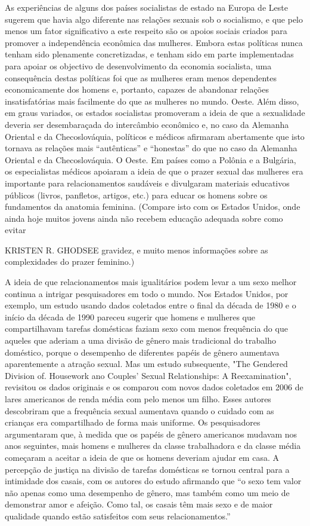  \par 
As experiências de alguns dos países socialistas de estado na Europa de Leste sugerem que havia algo diferente nas relações sexuais sob o socialismo, e que pelo menos um fator significativo a este respeito são os apoios sociais criados para promover a independência econômica das mulheres. Embora estas políticas nunca tenham sido plenamente concretizadas, e tenham sido em parte implementadas para apoiar os objectivo de desenvolvimento da economia socialista, uma consequência destas políticas foi que as mulheres eram menos dependentes economicamente dos homens e, portanto, capazes de abandonar relações insatisfatórias mais facilmente do que as mulheres no mundo. Oeste. Além disso, em graus variados, os estados socialistas promoveram a ideia de que a sexualidade deveria ser desembaraçada do intercâmbio econômico e, no caso da Alemanha Oriental e da Checoslováquia, políticos e médicos afirmaram abertamente que isto tornava as relações mais “autênticas” e “honestas” do que no caso da Alemanha Oriental e da Checoslováquia. O Oeste. Em países como a Polônia e a Bulgária, os especialistas médicos apoiaram a ideia de que o prazer sexual das mulheres era importante para relacionamentos saudáveis ​​e divulgaram materiais educativos públicos (livros, panfletos, artigos, etc.) para educar os homens sobre os fundamentos da anatomia feminina. (Compare isto com os Estados Unidos, onde ainda hoje muitos jovens ainda não recebem educação adequada sobre como evitar
 \par 
KRISTEN R. GHODSEE gravidez, e muito menos informações sobre as complexidades do prazer feminino.)
 \par 
A ideia de que relacionamentos mais igualitários podem levar a um sexo melhor continua a intrigar pesquisadores em todo o mundo. Nos Estados Unidos, por exemplo, um estudo usando dados coletados entre o final da década de 1980 e o início da década de 1990 pareceu sugerir que homens e mulheres que compartilhavam tarefas domésticas faziam sexo com menos frequência do que aqueles que aderiam a uma divisão de gênero mais tradicional do trabalho doméstico, porque o desempenho de diferentes papéis de gênero aumentava aparentemente a atração sexual. Mas um estudo subsequente, "The Gendered Division of. Housework ano Couples' Sexual Relationships: A Reexamination", revisitou os dados originais e os comparou com novos dados coletados em 2006 de lares americanos de renda média com pelo menos um filho. Esses autores descobriram que a frequência sexual aumentava quando o cuidado com as crianças era compartilhado de forma mais uniforme. Os pesquisadores argumentaram que, à medida que os papéis de gênero americanos mudavam nos anos seguintes, mais homens e mulheres da classe trabalhadora e da classe média começaram a aceitar a ideia de que os homens deveriam ajudar em casa. A percepção de justiça na divisão de tarefas domésticas se tornou central para a intimidade dos casais, com os autores do estudo afirmando que “o sexo tem valor não apenas como uma desempenho de gênero, mas também como um meio de demonstrar amor e afeição. Como tal, os casais têm mais sexo e de maior qualidade quando estão satisfeitos com seus relacionamentos.”
